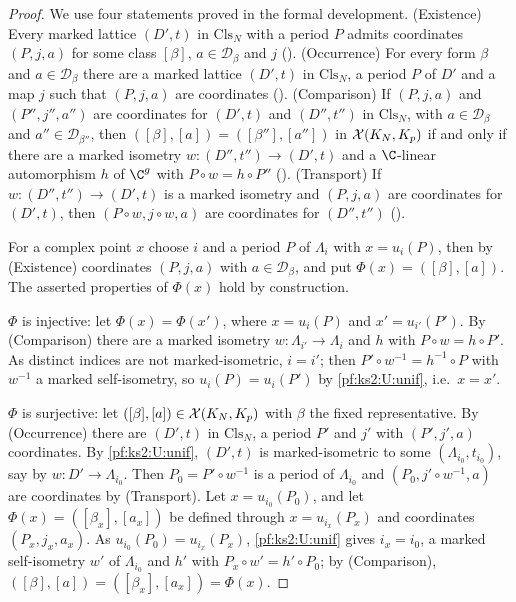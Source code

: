 \begin{proof}
We use four statements proved in the formal development. (Existence) Every marked lattice $(D',t)$
in $\mathrm{Cls}_N$ with a period $P$ admits coordinates $(P,j,a)$ for some class $[\beta]$,
$a\in\mathcal D_\beta$ and $j$ (). (Occurrence) For every
form $\beta$ and $a\in\mathcal D_\beta$ there are a marked lattice $(D',t)$ in $\mathrm{Cls}_N$, a
period $P$ of $D'$ and a map $j$ such that $(P,j,a)$ are coordinates
(). (Comparison) If $(P,j,a)$ and $(P'',j'',a'')$ are
coordinates for $(D',t)$ and $(D'',t'')$ in $\mathrm{Cls}_N$, with $a\in\mathcal D_\beta$ and
$a''\in\mathcal D_{\beta''}$, then $([\beta],[a])=([\beta''],[a''])$ in $\mathcal X(K_N,K_{p})$ if
and only if there are a marked isometry $w\colon(D'',t'')\to(D',t)$ and a $\C$-linear automorphism $h$
of $\C^g$ with $P\circ w=h\circ P''$ (). (Transport) If
$w\colon(D'',t'')\to(D',t)$ is a marked isometry and $(P,j,a)$ are coordinates for $(D',t)$, then
$(P\circ w,j\circ w,a)$ are coordinates for $(D'',t'')$ ().

For a complex point $x$ choose $i$ and a period $P$ of $\Lambda_i$ with $x=u_i(P)$, then by (Existence)
coordinates $(P,j,a)$ with $a\in\mathcal D_\beta$, and put $\Phi(x)=([\beta],[a])$. The asserted
properties of $\Phi(x)$ hold by construction.

$\Phi$ is injective: let $\Phi(x)=\Phi(x')$, where $x=u_i(P)$ and $x'=u_{i'}(P')$. By (Comparison)
there are a marked isometry $w\colon\Lambda_{i'}\to\Lambda_i$ and $h$ with $P\circ w=h\circ P'$. As
distinct indices are not marked-isometric, $i=i'$; then $P'\circ w^{-1}=h^{-1}\circ P$ with $w^{-1}$ a
marked self-isometry, so $u_i(P)=u_i(P')$ by \ref{pf:ks2:U:unif}, i.e.\ $x=x'$.

$\Phi$ is surjective: let $([\beta],[a])\in\mathcal X(K_N,K_{p})$ with $\beta$ the fixed
representative. By (Occurrence) there are $(D',t)$ in $\mathrm{Cls}_N$, a period $P'$ and $j'$ with
$(P',j',a)$ coordinates. By \ref{pf:ks2:U:unif}, $(D',t)$ is marked-isometric to some
$(\Lambda_{i_0},t_{i_0})$, say by $w\colon D'\to\Lambda_{i_0}$. Then $P_0=P'\circ w^{-1}$ is a period of
$\Lambda_{i_0}$ and $(P_0,j'\circ w^{-1},a)$ are coordinates by (Transport). Let $x=u_{i_0}(P_0)$, and let
$\Phi(x)=([\beta_x],[a_x])$ be defined through $x=u_{i_x}(P_x)$ and coordinates $(P_x,j_x,a_x)$. As
$u_{i_0}(P_0)=u_{i_x}(P_x)$, \ref{pf:ks2:U:unif} gives $i_x=i_0$, a marked self-isometry $w'$ of
$\Lambda_{i_0}$ and $h'$ with $P_x\circ w'=h'\circ P_0$; by (Comparison),
$([\beta],[a])=([\beta_x],[a_x])=\Phi(x)$.
\end{proof}

